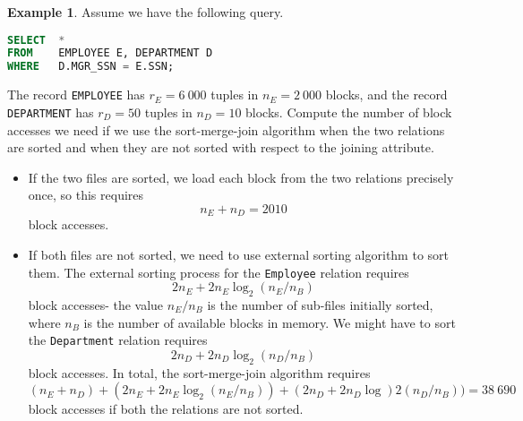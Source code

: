\documentclass[a4paper, openany]{memoir}
\theoremstyle{definition}
\newtheorem{example}[subsection]{Example}
\begin{document}
\begin{example}
    Assume we have the following query.
\begin{lstlisting}[language=SQL]
SELECT  *
FROM    EMPLOYEE E, DEPARTMENT D
WHERE   D.MGR_SSN = E.SSN;
\end{lstlisting}
    The record \texttt{EMPLOYEE} has $r_E = 6 \ 000$ tuples in $n_E = 2 \ 000$ blocks, and the record \texttt{DEPARTMENT} has $r_D = 50$ tuples in $n_D = 10$ blocks. Compute the number of block accesses we need if we use the sort-merge-join algorithm when the two relations are sorted and when they are not sorted with respect to the joining attribute.
\end{example}
\begin{answer}
    \begin{itemize}
        \item If the two files are sorted, we load each block from the two relations precisely once, so this requires 
        \[n_E + n_D = 2010\]
        block accesses. 
        \item If both files are not sorted, we need to use external sorting algorithm to sort them. The external sorting process for the \texttt{Employee} relation requires
        \[2n_E + 2n_E \log_2 (n_E/n_B)\]
        block accesses- the value $n_E/n_B$ is the number of sub-files initially sorted, where $n_B$ is the number of available blocks in memory. We might have to sort the \texttt{Department} relation requires
        \[2n_D + 2n_D \log_2 (n_D/n_B)\]
        block accesses. In total, the sort-merge-join algorithm requires
        \[(n_E + n_D) + (2n_E + 2n_E \log_2 (n_E/n_B)) + (2n_D + 2n_D \log)2 (n_D/n_B)) = 38 \ 690\]
        block accesses if both the relations are not sorted.         
    \end{itemize}
\end{answer}
\end{document}
